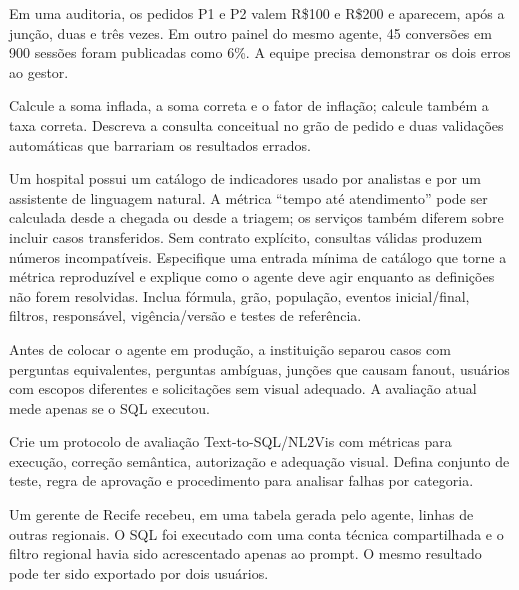 Em uma auditoria, os pedidos P1 e P2 valem R\$100 e R\$200 e aparecem, após a junção, duas e três vezes. Em outro painel do mesmo agente, 45 conversões em 900 sessões foram publicadas como 6\%. A equipe precisa demonstrar os dois erros ao gestor.

\FonteDidatica

\Comando Calcule a soma inflada, a soma correta e o fator de inflação; calcule também a taxa correta. Descreva a consulta conceitual no grão de pedido e duas validações automáticas que barrariam os resultados errados.

\TextoBase Um hospital possui um catálogo de indicadores usado por analistas e por um assistente de linguagem natural. A métrica ``tempo até atendimento'' pode ser calculada desde a chegada ou desde a triagem; os serviços também diferem sobre incluir casos transferidos. Sem contrato explícito, consultas válidas produzem números incompatíveis.
\FonteDidatica
\Comando Especifique uma entrada mínima de catálogo que torne a métrica reproduzível e explique como o agente deve agir enquanto as definições não forem resolvidas. Inclua fórmula, grão, população, eventos inicial/final, filtros, responsável, vigência/versão e testes de referência.

\TextoBase

Antes de colocar o agente em produção, a instituição separou casos com perguntas equivalentes, perguntas ambíguas, junções que causam fanout, usuários com escopos diferentes e solicitações sem visual adequado. A avaliação atual mede apenas se o SQL executou.

\FonteDidatica

\Comando Crie um protocolo de avaliação Text-to-SQL/NL2Vis com métricas para execução, correção semântica, autorização e adequação visual. Defina conjunto de teste, regra de aprovação e procedimento para analisar falhas por categoria.


\TextoBase

Um gerente de Recife recebeu, em uma tabela gerada pelo agente, linhas de outras regionais. O SQL foi executado com uma conta técnica compartilhada e o filtro regional havia sido acrescentado apenas ao prompt. O mesmo resultado pode ter sido exportado por dois usuários.

